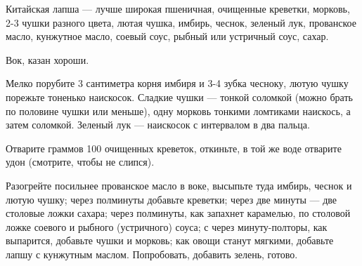 \documentclass[11pt,a5paper]{article}
\begin{document}
Китайская лапша --- лучше широкая пшеничная, очищенные креветки, морковь, 2-3 чушки разного цвета, лютая чушка, имбирь, чеснок, зеленый лук, прованское масло, кунжутное масло, соевый соус, рыбный или устричный соус, сахар.

Вок, казан хороши.

Мелко порубите 3 сантиметра корня имбиря и 3-4 зубка чесноку, лютую чушку порежьте тоненько наискосок. Сладкие чушки --- тонкой соломкой (можно брать по половине чушки или меньше), одну морковь тонкими ломтиками наискось, а затем соломкой. Зеленый лук --- наискосок с интервалом в два пальца.

Отварите граммов 100 очищенных креветок, откиньте, в той же воде отварите удон (смотрите, чтобы не слипся).

Разогрейте посильнее прованское масло в воке, высыпьте туда имбирь, чеснок и лютую чушку; через полминуты добавьте креветки; через две минуты --- две столовые ложки сахара; через полминуты, как запахнет карамелью, по столовой ложке соевого и рыбного (устричного) соуса; с через минуту-полторы, как выпарится, добавьте чушки и морковь; как овощи станут мягкими, добавьте лапшу с кунжутным маслом. Попробовать, добавить зелень, готово.
\end{document}
